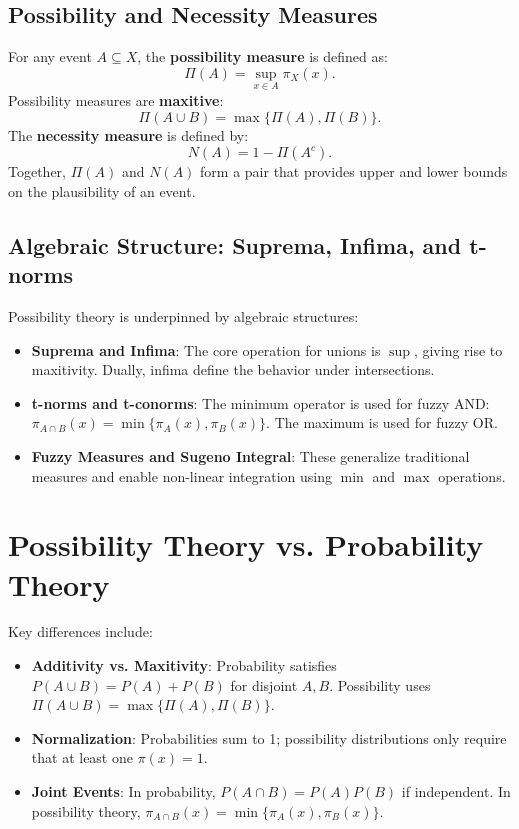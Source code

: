 \documentclass[14pt]{article}
\begin{document}
\subsection{Possibility and Necessity Measures}

For any event $A \subseteq X$, the \textbf{possibility measure} is defined as:
\[
\Pi(A) = \sup_{x \in A} \pi_X(x).
\]
Possibility measures are \textbf{maxitive}:
\[
\Pi(A \cup B) = \max\{\Pi(A),\Pi(B)\}.
\]
The \textbf{necessity measure} is defined by:
\[
N(A) = 1 - \Pi(A^c).
\]
Together, $\Pi(A)$ and $N(A)$ form a pair that provides upper and lower bounds on the plausibility of an event.

\subsection{Algebraic Structure: Suprema, Infima, and t-norms}

Possibility theory is underpinned by algebraic structures:
\begin{itemize}
    \item \textbf{Suprema and Infima}: The core operation for unions is $\sup$, giving rise to maxitivity. Dually, infima define the behavior under intersections.
    \item \textbf{t-norms and t-conorms}: The minimum operator is used for fuzzy AND: $\pi_{A \cap B}(x) = \min\{\pi_A(x), \pi_B(x)\}$. The maximum is used for fuzzy OR.
    \item \textbf{Fuzzy Measures and Sugeno Integral}: These generalize traditional measures and enable non-linear integration using $\min$ and $\max$ operations.
\end{itemize}

\section{Possibility Theory vs. Probability Theory}

Key differences include:
\begin{itemize}
    \item \textbf{Additivity vs. Maxitivity}: Probability satisfies $P(A \cup B) = P(A) + P(B)$ for disjoint $A, B$. Possibility uses $\Pi(A \cup B) = \max\{\Pi(A),\Pi(B)\}$.
    \item \textbf{Normalization}: Probabilities sum to 1; possibility distributions only require that at least one $\pi(x) = 1$.
    \item \textbf{Joint Events}: In probability, $P(A \cap B) = P(A)P(B)$ if independent. In possibility theory, $\pi_{A \cap B}(x) = \min\{\pi_A(x), \pi_B(x)\}$.
\end{itemize}
\end{document}

